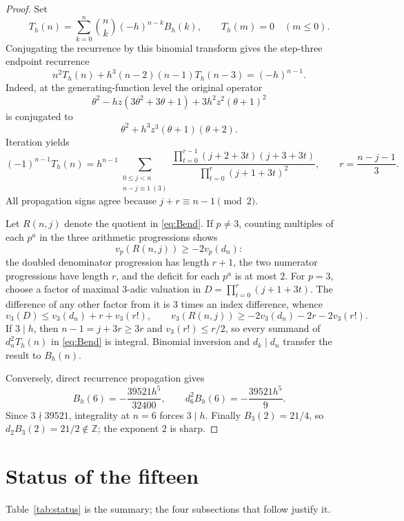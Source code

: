 \documentclass[11pt,reqno]{amsart}
\theoremstyle{plain}
\theoremstyle{definition}
\theoremstyle{remark}
\newcommand{\Z}{\mathbb{Z}}
\numberwithin{equation}{section}
\begin{document}
\begin{proof}
Set
\[
 T_h(n)=\sum_{k=0}^n\binom nk(-h)^{n-k}B_h(k),
 \qquad T_h(m)=0\quad(m\le0).
\]
Conjugating the recurrence by this binomial transform gives the step-three endpoint
recurrence
\[
 n^2T_h(n)+h^3(n-2)(n-1)T_h(n-3)=(-h)^{n-1}.
\]
Indeed, at the generating-function level the original operator
\[
 \theta^2-hz(3\theta^2+3\theta+1)+3h^2z^2(\theta+1)^2
\]
is conjugated to
\[
 \theta^2+h^3z^3(\theta+1)(\theta+2).
\]
Iteration yields
\[
 (-1)^{n-1}T_h(n)=h^{n-1}
 \sum_{\substack{0\le j<n\\n-j\equiv1\ (3)}}
 \frac{\prod_{t=0}^{r-1}(j+2+3t)(j+3+3t)}
      {\prod_{t=0}^{r}(j+1+3t)^2},
 \qquad r=\frac{n-j-1}{3}.
\tag{B-end}\label{eq:Bend}
\]
All propagation signs agree because $j+r\equiv n-1\pmod2$.

Let $R(n,j)$ denote the quotient in \eqref{eq:Bend}.  If $p\ne3$, counting multiples of
each $p^a$ in the three arithmetic progressions shows
\[
 v_p(R(n,j))\ge-2v_p(d_n):
\]
the doubled denominator progression has length $r+1$, the two numerator progressions
have length $r$, and the deficit for each $p^a$ is at most $2$.  For $p=3$, choose a
factor of maximal $3$-adic valuation in $D=\prod_{t=0}^r(j+1+3t)$.  The difference of any
other factor from it is $3$ times an index difference, whence
\[
 v_3(D)\le v_3(d_n)+r+v_3(r!),
 \qquad
 v_3(R(n,j))\ge-2v_3(d_n)-2r-2v_3(r!).
\]
If $3\mid h$, then $n-1=j+3r\ge3r$ and $v_3(r!)\le r/2$, so every summand of
$d_n^2T_h(n)$ in \eqref{eq:Bend} is integral.  Binomial inversion and $d_k\mid d_n$
transfer the result to $B_h(n)$.

Conversely, direct recurrence propagation gives
\[
 B_h(6)=-\frac{39521h^5}{32400},\qquad
 d_6^2B_h(6)=-\frac{39521h^5}{9}.
\]
Since $3\nmid39521$, integrality at $n=6$ forces $3\mid h$.  Finally
$B_3(2)=21/4$, so $d_2B_3(2)=21/2\notin\Z$; the exponent $2$ is sharp.
\end{proof}

\section{Status of the fifteen}\label{sec:status}

Table~\ref{tab:status} is the summary; the four subsections that follow justify it.
\end{document}

